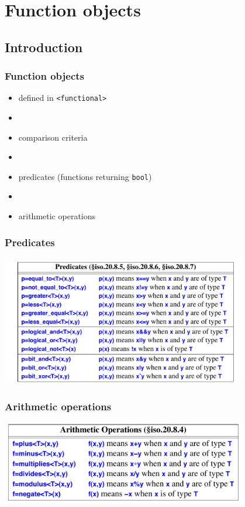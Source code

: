 \section{Function objects}
\subsection{Introduction}
\begin{frame}
  \frametitle{Function objects}
  \begin{itemize}
  \item defined in \texttt{<functional>}
  \item[]
  \item comparison criteria
  \item[]
  \item predicates (functions returning \texttt{bool})
  \item[]
  \item arithmetic operations
  \end{itemize}
\end{frame}
\begin{frame}
  \frametitle{Predicates}
  \centering
  \includegraphics[width=0.8\textwidth]{img/predicates.png}
\end{frame}
\begin{frame}
  \frametitle{Arithmetic operations}
  \centering
  \includegraphics[width=0.8\textwidth]{img/arithmetic.png}
\end{frame}

